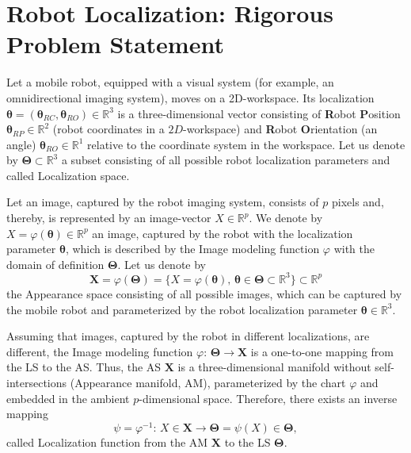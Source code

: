 \documentclass[conference]{IEEEtran} %
\def\mbTheta{{\bm\Theta}}
\def\mbtheta{{\bm\theta}}
\def\mbX{\mathbf{X}}
\def\RR{\mathbb{R}}
\begin{document}
\section{Robot Localization: Rigorous Problem Statement}
\label{sec2}

Let a mobile robot, equipped with a visual system (for example, an omnidirectional imaging system), moves on a 2D-workspace. Its localization $\mbtheta = (\mbtheta_{RC},\mbtheta_{RO})\in\RR^3$ is a three-dimensional vector consisting of \textbf{R}obot \textbf{P}osition $\mbtheta_{RP} \in \RR^2$ (robot coordinates in a $2D$-workspace) and \textbf{R}obot \textbf{O}rientation (an angle) $\mbtheta_{RO}\in\RR^1$ relative to the coordinate system in the workspace. Let us denote by $\mbTheta\subset\RR^3$ a subset consisting of all possible robot localization parameters and called Localization space.

Let an image, captured by the robot imaging system, consists of $p$ pixels and, thereby, is represented by an image-vector $X \in \RR^p$. We denote by $X =\varphi(\mbtheta)\in\RR^p$ an image, captured by the robot with the localization parameter $\mbtheta$, which is described by the Image modeling function $\varphi$ with the domain of definition $\mbTheta$. Let us denote by
\begin{equation}
\label{eq1}
\mbX = \varphi(\mbTheta) = \{X = \varphi(\mbtheta),\,\mbtheta\in\mbTheta\subset\RR^3\}\subset\RR^p
\end{equation}
the Appearance space consisting of all possible images, which can be captured by the mobile robot and parameterized by the robot localization parameter $\mbtheta\in\RR^3$.

Assuming that images, captured by the robot in different localizations, are different, the Image modeling function $\varphi:\,\mbTheta\to\mbX$ is a one-to-one mapping from the LS to the AS. Thus, the AS $\mbX$ is a three-dimensional manifold without self-intersections (Appearance manifold, AM), parameterized by the chart $\varphi$ and  embedded in the ambient $p$-dimensional space. Therefore, there exists an inverse mapping
\begin{equation}
\label{eq2}
	\psi = \varphi^{-1}:\,X\in\mbX\to\mbTheta = \psi(X) \in \mbTheta,
\end{equation}
called Localization function from the AM $\mbX$ to the LS $\mbTheta$.
\end{document}
